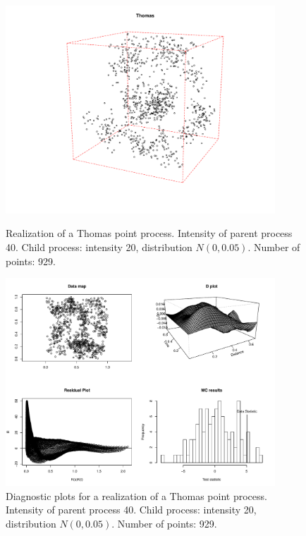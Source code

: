 \documentclass{article}
\begin{document}
\begin{figure}[p]
  \centering
    \includegraphics[width=0.9\textwidth]{PP_Thomas_40_20_0p05_929.pdf}
  \caption{Realization of a Thomas point process. Intensity of parent process 40. Child process: intensity 20, distribution $N(0,0.05)$. Number of points: 929.}
  \label{fig:thomas2Diag}

\vspace*{\floatsep}

    \includegraphics[width=0.9\textwidth]{diag_Thomas_40_20_0p05_929.pdf}
  \caption{Diagnostic plots for a realization of a Thomas point process. Intensity of parent process 40. Child process: intensity 20, distribution $N(0,0.05)$. Number of points: 929.}
  \label{fig:thomas2Diag}
\end{figure}
\end{document}
